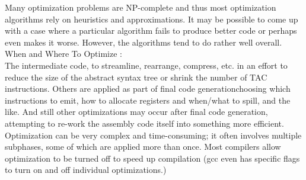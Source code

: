 \documentclass[11pt]{article}
\begin{document}
	Many optimization problems are NP-complete and thus most optimization algorithms rely on heuristics and approximations. It may be possible to come up with a case where a particular algorithm fails to produce better code or perhaps even makes it worse. However, the algorithms tend to do rather well overall.\\
	
	\noindent
	When and Where To Optimize :\\
	The intermediate code, to streamline, rearrange, compress, etc. in an effort to reduce the size of the abstract syntax tree or shrink the number of TAC instructions. Others are applied as part of final code generationchoosing which instructions to emit, how to allocate registers and when/what to spill, and the like. And still other optimizations may occur after final code generation, attempting to re-work the assembly code itself into something more efficient.\\
	
	Optimization can be very complex and time-consuming; it often involves multiple subphases, some of which are applied more than once. Most compilers allow optimization to be turned off to speed up compilation (gcc even has specific flags to turn on and off individual optimizations.)\\
	
\end{document}
